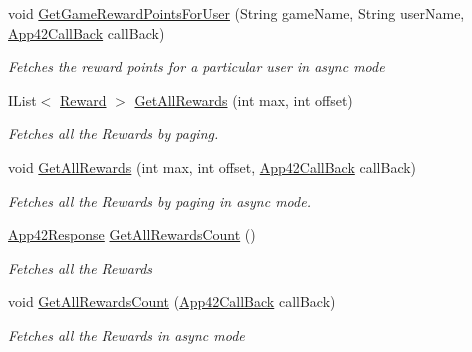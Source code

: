\begin{DoxyCompactItemize}
void \hyperlink{classcom_1_1shephertz_1_1app42_1_1paas_1_1sdk_1_1csharp_1_1reward_1_1_reward_service_a4ad8172abe5b9f5c524b16286c6763bc}{Get\+Game\+Reward\+Points\+For\+User} (String game\+Name, String user\+Name, \hyperlink{interfacecom_1_1shephertz_1_1app42_1_1paas_1_1sdk_1_1csharp_1_1_app42_call_back}{App42\+Call\+Back} call\+Back)
\begin{DoxyCompactList}\small\item\em Fetches the reward points for a particular user in async mode \end{DoxyCompactList}\item 
I\+List$<$ \hyperlink{classcom_1_1shephertz_1_1app42_1_1paas_1_1sdk_1_1csharp_1_1reward_1_1_reward}{Reward} $>$ \hyperlink{classcom_1_1shephertz_1_1app42_1_1paas_1_1sdk_1_1csharp_1_1reward_1_1_reward_service_ac93befb73a09fa2f89cff69519596e43}{Get\+All\+Rewards} (int max, int offset)
\begin{DoxyCompactList}\small\item\em Fetches all the Rewards by paging. \end{DoxyCompactList}\item 
void \hyperlink{classcom_1_1shephertz_1_1app42_1_1paas_1_1sdk_1_1csharp_1_1reward_1_1_reward_service_a21f06ebb90d4b6c137e9f1811e232d71}{Get\+All\+Rewards} (int max, int offset, \hyperlink{interfacecom_1_1shephertz_1_1app42_1_1paas_1_1sdk_1_1csharp_1_1_app42_call_back}{App42\+Call\+Back} call\+Back)
\begin{DoxyCompactList}\small\item\em Fetches all the Rewards by paging in async mode. \end{DoxyCompactList}\item 
\hyperlink{classcom_1_1shephertz_1_1app42_1_1paas_1_1sdk_1_1csharp_1_1_app42_response}{App42\+Response} \hyperlink{classcom_1_1shephertz_1_1app42_1_1paas_1_1sdk_1_1csharp_1_1reward_1_1_reward_service_aeec97f7643c714d03d29174b2ef58bb0}{Get\+All\+Rewards\+Count} ()
\begin{DoxyCompactList}\small\item\em Fetches all the Rewards \end{DoxyCompactList}\item 
void \hyperlink{classcom_1_1shephertz_1_1app42_1_1paas_1_1sdk_1_1csharp_1_1reward_1_1_reward_service_a2d417c569de33f733bdad69fe8a64d8e}{Get\+All\+Rewards\+Count} (\hyperlink{interfacecom_1_1shephertz_1_1app42_1_1paas_1_1sdk_1_1csharp_1_1_app42_call_back}{App42\+Call\+Back} call\+Back)
\begin{DoxyCompactList}\small\item\em Fetches all the Rewards in async mode \end{DoxyCompactList}\item 

\end{DoxyCompactItemize}
